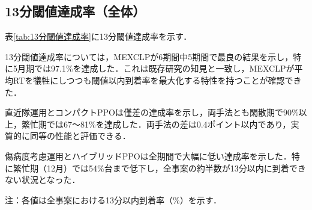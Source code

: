 \subsection{13分閾値達成率（全体）}
表\ref{tab:13分閾値達成率}に13分閾値達成率を示す．

13分閾値達成率については，MEXCLPが6期間中5期間で最良の結果を示し，特に5月期では97.1\%を達成した．これは既存研究\cite{Jagtenberg2017}の知見と一致し，MEXCLPが平均RTを犠牲にしつつも閾値以内到着率を最大化する特性を持つことが確認できた．

直近隊運用とコンパクトPPOは僅差の達成率を示し，両手法とも閑散期で90\%以上，繁忙期では67～81\%を達成した．両手法の差は0.4ポイント以内であり，実質的に同等の性能と評価できる．

傷病度考慮運用とハイブリッドPPOは全期間で大幅に低い達成率を示した．特に繁忙期（12月）では54\%台まで低下し，全事案の約半数が13分以内に到着できない状況となった．

\begin{table}
    \centering
    \caption{全体の13分閾値達成率（\%）}
    \label{tab:13分閾値達成率}
    \footnotesize
    \begin{flushleft}
    注：各値は全事案における13分以内到着率（\%）を示す．
    \end{flushleft}
\end{table}
\clearpage

